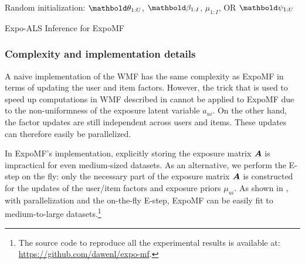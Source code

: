 \begin{algorithm}
\DontPrintSemicolon %
Random initialization: $\mb\theta_{1:U}$, $\mb\beta_{1:I}$, $\mu_{1:I}$, OR $\mb\psi_{1:U}$\;
\;
\caption{{\sc Expo-ALS} Inference for ExpoMF}
\label{chpt:expomf:algo:expomf}
\end{algorithm}

\subsubsection{Complexity and implementation details}

A naive implementation of the \gls{WMF} has the same complexity as ExpoMF in terms of updating the user and item factors. However, the trick that is used to speed up computations in \gls{WMF} described in  cannot be applied to ExpoMF due to the non-uniformness of the exposure latent variable $a_{ui}$. On the other hand, the factor updates are still independent across users and items. These updates can therefore easily be parallelized.

In ExpoMF's implementation, explicitly storing the exposure matrix $\boldsymbol{A}$ is impractical for even medium-sized datasets. As an alternative, we perform the E-step on the fly: only the necessary part of the exposure matrix $\boldsymbol{A}$ is constructed for the updates of the user/item factors and exposure priors $\mu_{ui}$. As shown in , with parallelization and the on-the-fly E-step, ExpoMF can be easily fit to medium-to-large datasets.\footnote{The source code to reproduce all the experimental results is available at: \url{https://github.com/dawenl/expo-mf}.}


